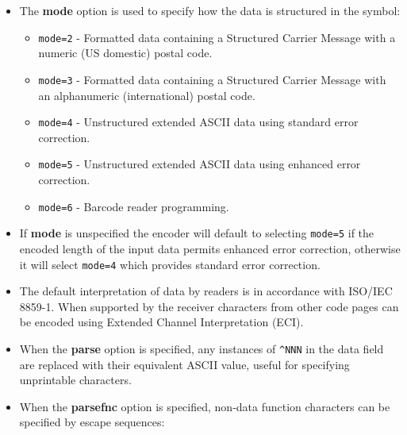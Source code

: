 \begin{itemize}
\tightlist
\item
  The \textbf{mode} option is used to specify how the data is structured
  in the symbol:

  \begin{itemize}
  \tightlist
  \item
    \texttt{mode=2} - Formatted data containing a Structured Carrier
    Message with a numeric (US domestic) postal code.
  \item
    \texttt{mode=3} - Formatted data containing a Structured Carrier
    Message with an alphanumeric (international) postal code.
  \item
    \texttt{mode=4} - Unstructured extended ASCII data using standard
    error correction.
  \item
    \texttt{mode=5} - Unstructured extended ASCII data using enhanced
    error correction.
  \item
    \texttt{mode=6} - Barcode reader programming.
  \end{itemize}
\item
  If \textbf{mode} is unspecified the encoder will default to selecting
  \texttt{mode=5} if the encoded length of the input data permits
  enhanced error correction, otherwise it will select \texttt{mode=4}
  which provides standard error correction.
\item
  The default interpretation of data by readers is in accordance with
  ISO/IEC 8859-1. When supported by the receiver characters from other
  code pages can be encoded using Extended Channel Interpretation (ECI).
\item
  When the \textbf{parse} option is specified, any instances of
  \texttt{\^{}NNN} in the data field are replaced with their equivalent
  ASCII value, useful for specifying unprintable characters.
\item
  When the \textbf{parsefnc} option is specified, non-data function
  characters can be specified by escape sequences:


\end{itemize}
